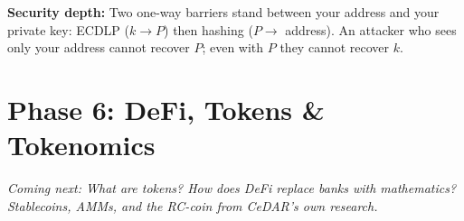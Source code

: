 \documentclass[12pt, a4paper]{article}
\begin{document}
\textbf{Security depth:} Two one-way barriers stand between your address and
your private key: ECDLP ($k \to P$) then hashing ($P \to$ address). An
attacker who sees only your address cannot recover $P$; even with $P$ they
cannot recover $k$.

\section{Phase 6: DeFi, Tokens \& Tokenomics} %

\textit{Coming next: What are tokens? How does DeFi replace banks with
mathematics? Stablecoins, AMMs, and the RC-coin from CeDAR's own research.}
\end{document}
